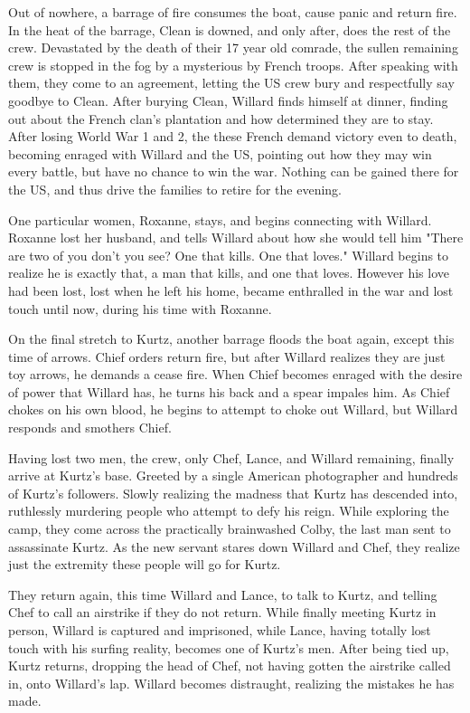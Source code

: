 \documentclass[a4paper,man,natbib]{apa6}
\begin{document}
Out of nowhere, a barrage of fire consumes the boat, cause panic and return fire. In the heat of the barrage, Clean is downed, and only after, does the rest of the crew. Devastated by the death of their 17 year old comrade, the sullen remaining crew is stopped in the fog by a mysterious by French troops. After speaking with them, they come to an agreement, letting the US crew bury and respectfully say goodbye to Clean. After burying Clean, Willard finds himself at dinner, finding out about the French clan's plantation and how determined they are to stay. After losing World War 1 and 2, the these French demand victory even to death, becoming enraged with Willard and the US, pointing out how they may win every battle, but have no chance to win the war. Nothing can be gained there for the US, and thus drive the families to retire for the evening.

One particular women, Roxanne, stays, and begins connecting with Willard. Roxanne lost her husband, and tells Willard about how she would tell him "There are two of you don't you see? One that kills. One that loves." Willard begins to realize he is exactly that, a man that kills, and one that loves. However his love had been lost, lost when he left his home, became enthralled in the war and lost touch until now, during his time with Roxanne.

On the final stretch to Kurtz, another barrage floods the boat again, except this time of arrows. Chief orders return fire, but after Willard realizes they are just toy arrows, he demands a cease fire. When Chief becomes enraged with the desire of power that Willard has, he turns his back and a spear impales him. As Chief chokes on his own blood, he begins to attempt to choke out Willard, but Willard responds and smothers Chief.

Having lost two men, the crew, only Chef, Lance, and Willard remaining, finally arrive at Kurtz's base. Greeted by a single American photographer and hundreds of Kurtz's followers. Slowly realizing the madness that Kurtz has descended into, ruthlessly murdering people who attempt to defy his reign. While exploring the camp, they come across the practically brainwashed Colby, the last man sent to assassinate Kurtz. As the new servant stares down Willard and Chef, they realize just the extremity these people will go for Kurtz.

They return again, this time Willard and Lance, to talk to Kurtz, and telling Chef to call an airstrike if they do not return. While finally meeting Kurtz in person, Willard is captured and imprisoned, while Lance, having totally lost touch with his surfing reality, becomes one of Kurtz's men. After being tied up, Kurtz returns, dropping the head of Chef, not having gotten the airstrike called in, onto Willard's lap. Willard becomes distraught, realizing the mistakes he has made.
\end{document}
